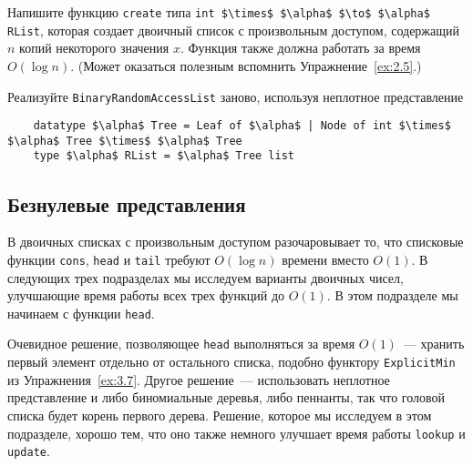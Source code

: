 \begin{exercise}\label{ex:9.2}
  Напишите функцию \lstinline!create! типа 
  \lstinline!int $\times$ $\alpha$ $\to$ $\alpha$ RList!, которая создает
  двоичный список с произвольным доступом, содержащий $n$ копий
  некоторого значения $x$. Функция также должна работать за время
  $O(\log n)$. (Может оказаться полезным вспомнить Упражнение~\ref{ex:2.5}.)
\end{exercise}

\begin{exercise}\label{ex:9.3}
  Реализуйте \lstinline!BinaryRandomAccessList! заново, используя
  неплотное представление
  \begin{lstlisting}
    datatype $\alpha$ Tree = Leaf of $\alpha$ | Node of int $\times$ $\alpha$ Tree $\times$ $\alpha$ Tree
    type $\alpha$ RList = $\alpha$ Tree list
  \end{lstlisting}
\end{exercise}

\subsection{Безнулевые представления}
\label{sc:9.2.2}

В двоичных списках с произвольным доступом разочаровывает то, что
списковые функции \lstinline!cons!, \lstinline!head! и
\lstinline!tail! требуют $O(\log n)$ времени вместо $O(1)$. В
следующих трех подразделах мы исследуем варианты двоичных чисел,
улучшающие время работы всех трех функций до $O(1)$. В этом подразделе
мы начинаем с функции \lstinline!head!.

\begin{remark}
  Очевидное решение, позволяющее \lstinline!head! выполняться за время
  $O(1)$~--- хранить первый элемент отдельно от остального списка,
  подобно функтору \lstinline!ExplicitMin! из
  Упражнения~\ref{ex:3.7}. Другое решение~--- использовать неплотное
  представление и либо биномиальные деревья, либо пеннанты, так что
  головой списка будет корень первого дерева. Решение, которое мы
  исследуем в этом подразделе, хорошо тем, что оно также немного
  улучшает время работы \lstinline!lookup! и \lstinline!update!.
\end{remark}


